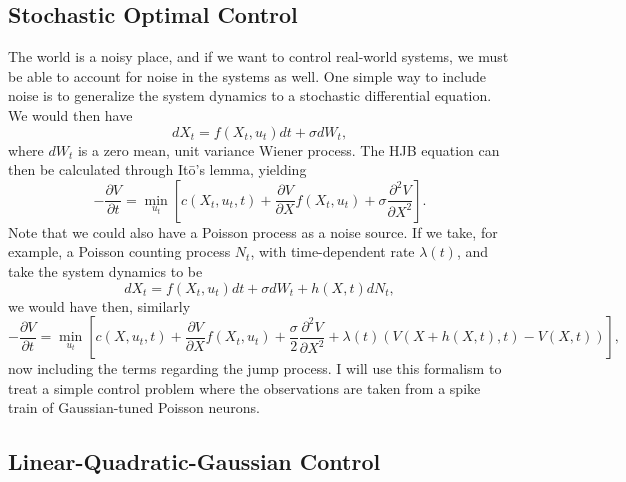 \subsection{Stochastic Optimal Control}

The world is a noisy place, and if we want to control real-world systems, we must be able to account for noise in the systems as well. One simple way to include noise is to generalize the system dynamics to a stochastic differential equation. We would then have
$$
dX_t = f(X_t,u_t) dt + \sigma dW_t,
$$
where $dW_t$ is a zero mean, unit variance Wiener process.
The HJB equation can then be calculated through It\=o's lemma, yielding
$$
-\frac{\partial V}{\partial t} = \min_{u_t} \left[c(X_t,u_t,t) + \frac{\partial V}{\partial X} f(X_t,u_t) + \sigma \frac{\partial^2 V}{\partial X^2} \right].
$$
Note that we could also have a Poisson process as a noise source. If we take, for example, a Poisson counting process $N_t$, with time-dependent rate $\lambda(t)$, and take the system dynamics to be
$$
dX_t = f(X_t,u_t) dt + \sigma dW_t + h(X,t) dN_t,
$$
we would have then, similarly
$$
-\frac{\partial V}{\partial t} = \min_{u_t} \left[c(X,u_t,t) + \frac{\partial V}{\partial X} f(X_t,u_t) + \frac{\sigma}{2} \frac{\partial^2 V}{\partial X^2} + \lambda(t) \left(V(X+h(X,t),t)-V(X,t)\right)\right],
$$
now including the terms regarding the jump process.\cite{Theodorou2012,Sennewald2006} I will use this formalism to treat a simple control problem where the observations are taken from a spike train of Gaussian-tuned Poisson neurons.

\subsection{Linear-Quadratic-Gaussian Control}

